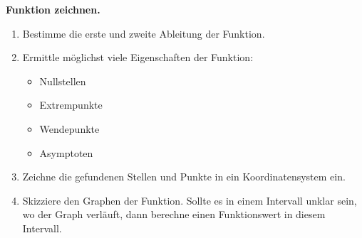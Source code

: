 \begin{koch}
  \textbf{Funktion zeichnen.}
  \begin{enumerate}
    \item Bestimme die erste und zweite Ableitung der Funktion.
    \item Ermittle möglichst viele Eigenschaften der Funktion:
    \begin{itemize}
      \item Nullstellen
      \item Extrempunkte
      \item Wendepunkte
      \item Asymptoten
    \end{itemize}
    \item Zeichne die gefundenen Stellen und Punkte in ein Koordinatensystem ein.
    \item Skizziere den Graphen der Funktion. Sollte es in einem Intervall unklar sein, wo der Graph verläuft, dann berechne einen Funktionswert in diesem Intervall.
  \end{enumerate}
\end{koch}

\clearpage


